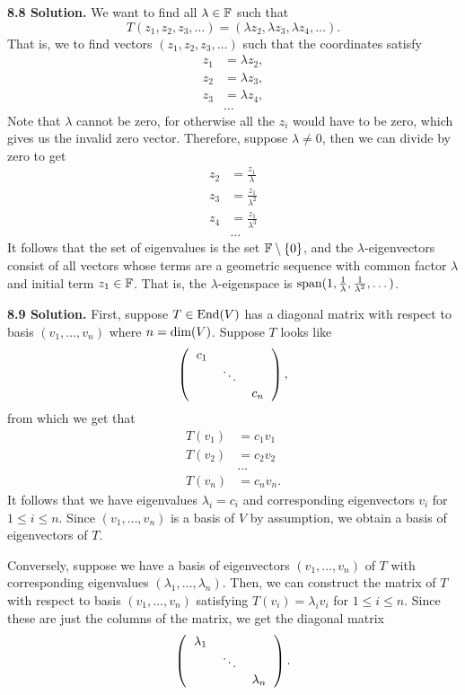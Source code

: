 \textbf{8.8 Solution.} We want to find all $\lambda \in \mathbb{F}$ such that
\[
T(z_1, z_2, z_3, \dots) = (\lambda z_2, \lambda z_3, \lambda z_4, \dots).
\]
That is, we to find vectors $(z_1, z_2, z_3, \dots)$ such that the coordinates satisfy
\begin{align*}
    z_1 &= \lambda z_2, \\
    z_2 &= \lambda z_3, \\
    z_3 &= \lambda z_4, \\
        &\dots
\end{align*}
Note that $\lambda$ cannot be zero, for otherwise all the $z_i$ would have to be zero, which gives us the invalid zero vector. Therefore, suppose $\lambda \neq 0$, then we can divide by zero to get
\begin{align*}
    z_2 &= \frac{z_1}{\lambda} \\
    z_3 &= \frac{z_1}{\lambda^2} \\
    z_4 &= \frac{z_1}{\lambda^3} \\
        &\dots
\end{align*}
It follows that the set of eigenvalues is the set $\mathbb{F} \setminus \{0\}$, and the $\lambda$-eigenvectors consist of all vectors whose terms are a geometric sequence with common factor $\lambda$ and initial term $z_1 \in \mathbb{F}$. That is, the $\lambda$-eigenspace is $\text{span}(1, \frac{1}{\lambda}, \frac{1}{\lambda^2}, \dots)$.

\textbf{8.9 Solution.} First, suppose $T \in \text{End}(V)$ has a diagonal matrix with respect to basis $(v_1, \dots, v_n)$ where $n = \text{dim}(V)$. Suppose $T$ looks like
\[\left(
\begin{tabular}{ccc}
$c_1$ & & \\
 & $\ddots$ & \\
 & & $c_n$
\end{tabular}
\right),\]
from which we get that
\begin{align*}
    T(v_1) &= c_1v_1 \\
    T(v_2) &= c_2v_2 \\
        &\dots \\
    T(v_n) &= c_nv_n.
\end{align*}
It follows that we have eigenvalues $\lambda_i = c_i$ and corresponding eigenvectors $v_i$ for $1 \leq i \leq n$. Since $(v_1, \dots, v_n)$ is a basis of $V$ by assumption, we obtain a basis of eigenvectors of $T$.

Conversely, suppose we have a basis of eigenvectors $(v_1, \dots, v_n)$ of $T$ with corresponding eigenvalues $(\lambda_1, \dots, \lambda_n)$. Then, we can construct the matrix of $T$ with respect to basis $(v_1, \dots, v_n)$ satisfying $T(v_i) = \lambda_iv_i$ for $1 \leq i \leq n$. Since these are just the columns of the matrix, we get the diagonal matrix
\[\left(
\begin{tabular}{ccc}
    $\lambda_1$ & & \\
     & $\ddots$ & \\
     & & $\lambda_n$
\end{tabular}
\right).\]

